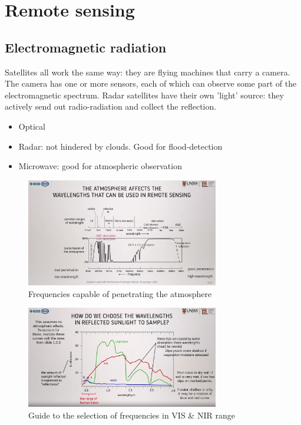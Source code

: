 
\section{Remote sensing}


\subsection{Electromagnetic radiation}
Satellites all work the same way: they are flying machines that carry a camera. The camera has one or more sensors, each of which can observe some part of the electromagnetic spectrum.
Radar satellites have their own 'light' source: they actively send out radio-radiation and collect the reflection.

\begin{itemize}
    \item Optical
    \item Radar: not hindered by clouds. Good for flood-detection
    \item Microwave: good for atmospheric observation
\end{itemize}


\begin{figure}[H]
    \caption{Frequencies capable of penetrating the atmosphere}
    \centering
      \includegraphics[width=0.75\textwidth]{images/rs_atmospheric_absorption.png}
\end{figure}

\begin{figure}[H]
    \caption{Guide to the selection of frequencies in VIS \& NIR range}
    \centering
      \includegraphics[width=0.75\textwidth]{images/rs_vis_nir_curves.png}
\end{figure}

